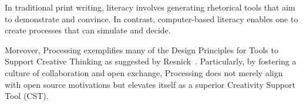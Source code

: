 In traditional print writing, literacy involves generating rhetorical tools that aim to demonstrate and convince. In contrast, computer-based literacy enables one to create processes that can simulate and decide. %

Moreover, Processing exemplifies many of the Design Principles for Tools to Support Creative Thinking as suggested by Resnick~\parencite{resnickDesignPrinciplesTools}. Particularly, by fostering a culture of collaboration and open exchange, Processing does not merely align with open source motivations but elevates itself as a superior Creativity Support Tool (CST). %